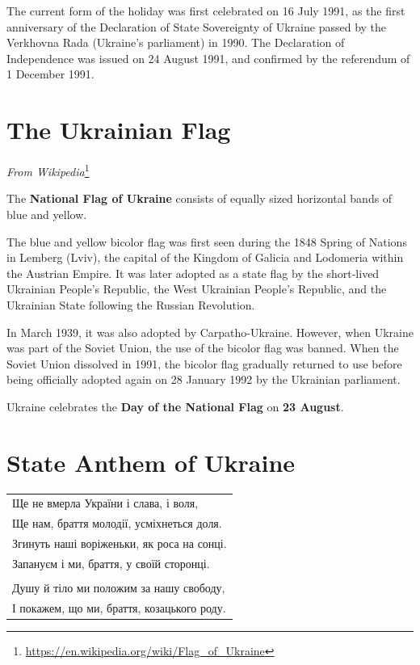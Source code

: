 The current form of the holiday was first celebrated on 16 July 1991, as the first
anniversary of the Declaration of State Sovereignty of Ukraine passed by the
Verkhovna Rada (Ukraine's parliament) in 1990.
The Declaration of Independence was issued on 24 August 1991, 
and confirmed by the referendum of 1 December 1991.

\section{The Ukrainian Flag}

\textit{From Wikipedia}\footnote{\url{https://en.wikipedia.org/wiki/Flag_of_Ukraine}}

The \textbf{National Flag of Ukraine} consists of equally sized horizontal bands of blue and yellow.

The blue and yellow bicolor flag was first seen during the 1848 Spring of Nations in Lemberg (Lviv),
the capital of the Kingdom of Galicia and Lodomeria within the Austrian Empire. 
It was later adopted as a state flag by the short-lived Ukrainian People's Republic,
the West Ukrainian People's Republic, and the Ukrainian State following the Russian Revolution.

In March 1939, it was also adopted by Carpatho-Ukraine. However, when Ukraine was part of the Soviet
Union, the use of the bicolor flag was banned.  When the Soviet Union dissolved in 1991, 
the bicolor flag gradually returned to use before being officially adopted again on 
28 January 1992 by the Ukrainian parliament.

Ukraine celebrates the \textbf{Day of the National Flag} on \textbf{23 August}.


\newpage

\section{State Anthem of Ukraine}

\begin{center}
\begin{ukrainian}
\begin{tabular}{l}
Ще не вмерла України і слава, і воля, \\
Ще нам, браття молодії, усміхнеться доля. \\
Згинуть наші воріженьки, як роса на сонці. \\
Запануєм і ми, браття, у своїй сторонці. \\
\\
Душу й тіло ми положим за нашу свободу, \\
І покажем, що ми, браття, козацького роду. \\
\end{tabular}
\end{ukrainian}
\end{center}

